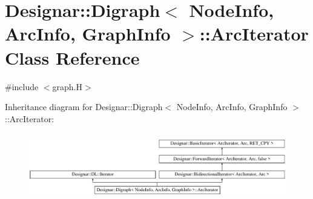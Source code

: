 \hypertarget{class_designar_1_1_digraph_1_1_arc_iterator}{}\section{Designar\+:\+:Digraph$<$ Node\+Info, Arc\+Info, Graph\+Info $>$\+:\+:Arc\+Iterator Class Reference}
\label{class_designar_1_1_digraph_1_1_arc_iterator}


{\ttfamily \#include $<$graph.\+H$>$}

Inheritance diagram for Designar\+:\+:Digraph$<$ Node\+Info, Arc\+Info, Graph\+Info $>$\+:\+:Arc\+Iterator\+:\begin{figure}[H]
\begin{center}
\leavevmode
\includegraphics[height=2.947368cm]{class_designar_1_1_digraph_1_1_arc_iterator}
\end{center}
\end{figure}

